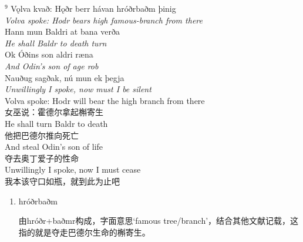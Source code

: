 \begin{paracol}{2}
  \noindent
  $^9$ Vǫlva kvað: Hǫðr berr hávan hróðrbaðm þinig\\
  \textit{Volva spoke: Hodr bears high famous-branch from there}\\
  Hann mun Baldri at bana verða\\
  \textit{He shall Baldr to death turn}\\
  Ok Óðins son aldri ræna\\
  \textit{And Odin's son of age rob}\\
  Nauðug sagðak, nú mun ek þegja\\
  \textit{Unwillingly I spoke, now must I be silent}\\
  \switchcolumn
  \noindent
  Volva spoke: Hodr will bear the high branch from there\\
  女巫说：霍德尔拿起槲寄生\\
  He shall turn Baldr to death\\
  他把巴德尔推向死亡\\
  And steal Odin's son of life\\
  夺去奥丁爱子的性命\\
  Unwillingly I spoke, now I must cease\\
  我本该守口如瓶，就到此为止吧
\end{paracol}
\begin{grammar*}{}
  \begin{enumerate}[leftmargin=*]
    \item hróðrbaðm

          由hróðr+baðmr构成，字面意思`famous tree/branch'，结合其他文献记载，这指的就是夺走巴德尔生命的槲寄生。
  \end{enumerate}
\end{grammar*}

